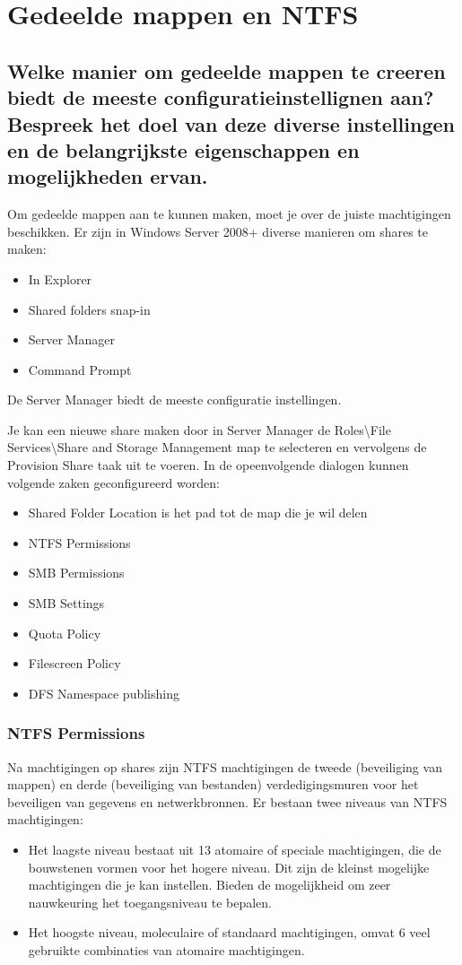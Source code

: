 \chapter{Gedeelde mappen en NTFS}

\section{Welke manier om gedeelde mappen te creeren biedt de meeste
configuratieinstellignen aan? Bespreek het doel van deze diverse instellingen en
de belangrijkste eigenschappen en mogelijkheden ervan.}

Om gedeelde mappen aan te kunnen maken, moet je over de juiste machtigingen
beschikken. Er zijn in Windows Server 2008+ diverse manieren om shares te maken:
\begin{itemize}
	\item In Explorer
	\item Shared folders snap-in
	\item Server Manager
	\item Command Prompt
\end{itemize}

De Server Manager biedt de meeste configuratie instellingen.

Je kan een nieuwe share maken door in Server Manager de Roles\textbackslash File
Services\textbackslash Share and Storage Management map te selecteren en
vervolgens de Provision Share taak uit te voeren. In de opeenvolgende dialogen
kunnen volgende zaken geconfigureerd worden:
\begin{itemize}
	\item Shared Folder Location is het pad tot de map die je wil delen
	\item NTFS Permissions
	\item SMB Permissions
	\item SMB Settings
	\item Quota Policy
	\item Filescreen Policy
	\item DFS Namespace publishing
\end{itemize}

\subsection{NTFS Permissions}

Na machtigingen op shares zijn NTFS machtigingen de tweede (beveiliging van
mappen) en derde (beveiliging van bestanden) verdedigingsmuren voor het
beveiligen van gegevens en netwerkbronnen. Er bestaan twee niveaus van NTFS
machtigingen:
\begin{itemize}
	\item Het laagste niveau bestaat uit 13 atomaire of speciale
		machtigingen, die de bouwstenen vormen voor het hogere niveau.
		Dit zijn de kleinst mogelijke machtigingen die je kan instellen.
		Bieden de mogelijkheid om zeer nauwkeuring het toegangsniveau te
		bepalen.
	\item Het hoogste niveau, moleculaire of standaard machtigingen, omvat 6
		veel gebruikte combinaties van atomaire machtigingen.
\end{itemize}

